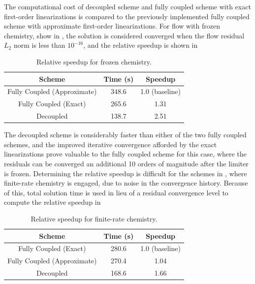 The computational cost of decoupled scheme and fully coupled scheme with exact
first-order linearizations is compared to the previously implemented fully coupled
scheme with approximate first-order linearizations.
For flow with frozen chemistry, show in ,
the solution is considered converged when the flow residual $L_2$ norm is less
than $10^{-16}$, and the relative speedup is shown in
\begin{table}[h]
  \centering
  \begin{tabular}{c|c|c}
    Scheme & Time (s) & Speedup \\
    \hline
    Fully Coupled (Approximate) & 348.6 & 1.0 (baseline) \\
    Fully Coupled (Exact)       & 265.6 & 1.31 \\
    Decoupled                   & 138.7 & 2.51
  \end{tabular}
  \caption{Relative speedup for frozen chemistry.}
  \label{tab:srp-rel-speedup-frozen}
\end{table}
The decoupled scheme is considerably faster than either of the two fully coupled
schemes, and the improved iterative convergence afforded by the exact
linearizations prove valuable to the fully coupled scheme for this case, where
the residuals can be converged an additional 10 orders of magnitude after the
limiter is frozen.  Determining the relative speedup is difficult for the
schemes in , where finite-rate chemistry is
engaged, due to noise in the convergence history.  Because of this, total
solution time is used in lieu of a residual convergence level to compute the
relative speedup in 
\begin{table}[h]
  \centering
  \begin{tabular}{c|c|c}
    Scheme & Time (s) & Speedup \\
    \hline
    Fully Coupled (Exact)       & 280.6 & 1.0 (baseline) \\
    Fully Coupled (Approximate) & 270.4 & 1.04 \\
    Decoupled                   & 168.6 & 1.66
  \end{tabular}
  \caption{Relative speedup for finite-rate chemistry.}
  \label{tab:srp-rel-speedup-chem}
\end{table}

